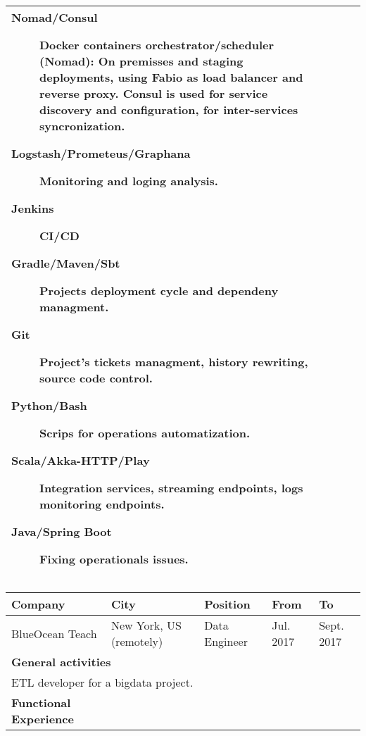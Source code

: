 \begin{cventries}
\begin{tabular}{|p{4.5cm} | p{2cm} | p{4cm} | p{2cm} | p{2cm}|}
{\begin{description}
                        \item[Nomad/Consul] Docker containers orchestrator/scheduler (Nomad): On premisses and staging deployments, using Fabio as load balancer and reverse proxy. Consul is used for service discovery and configuration, for inter-services syncronization.

                        \item[Logstash/Prometeus/Graphana] Monitoring and loging analysis.

                        \item[Jenkins] CI/CD

                        \item[Gradle/Maven/Sbt] Projects deployment cycle and dependeny managment.
                        \item[Git] Project's tickets managment, history rewriting, source code control.

                        \item[Python/Bash] Scrips for operations automatization.

                        \item[Scala/Akka-HTTP/Play] Integration services, streaming endpoints, logs monitoring endpoints.

                        \item[Java/Spring Boot] Fixing operationals issues.

                       \end{description}
      } \\
 

    \hline

  \end{tabular}



  \begin{tabular}{|p{4.5cm} | p{2cm} | p{4cm} | p{2cm} | p{2cm}|}
    \hline
    \textbf{Company} & 
    \textbf{City} & 
    \textbf{Position} & 
    \textbf{From} & \textbf{To} \\
     \hline
    BlueOcean Teach & 
    New York, US \hspace{1cm} (remotely) & 
    Data Engineer & 
    
    Jul. 2017 & Sept. 2017 \\ 
    \hline
    \multicolumn{5}{|l|}{\textbf{General activities}} \\

     \multicolumn{5}{|p{15cm}|}{
       ETL developer for a bigdata project.
       } \\
     \hline
    \textbf{Functional Experience} & \multicolumn{4}{p{12cm}|}{

}
\end{tabular}
\end{cventries}
